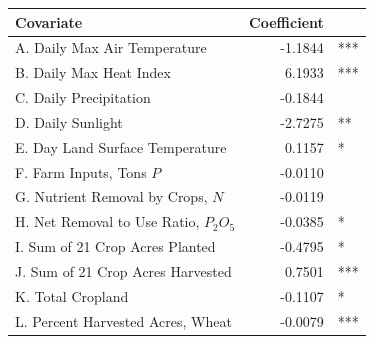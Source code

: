 \documentclass[paperwidth=42in,paperheight=44in,fontscale=0.31]{baposter}
\begin{document}
\begin{poster}
{\begin{center}
\begin{tabular}{l r l}
\toprule
\textbf{Covariate} & \textbf{Coefficient} & \\
\midrule
A. Daily Max Air Temperature \cite{nldas} & -1.1844  &  *** \\ %
B. Daily Max Heat Index \cite{nldas} &  6.1933  &  *** \\ %
C. Daily Precipitation  \cite{nldas} &  -0.1844  &  \\ %
D. Daily Sunlight   \cite{nldas}  & -2.7275  & ** \\ %
E. Day Land Surface Temperature \cite{modis} &  0.1157   &  *  \\ %
F. Farm Inputs, Tons $P$ \cite{nuGIS} & -0.0110 \\ %
G. Nutrient Removal by Crops, $N$ \cite{nuGIS} & -0.0119  &  \\   %
H. Net Removal to Use Ratio, $P_2 O_5$  \cite{nuGIS} & -0.0385  &  * \\ %
I. Sum of 21 Crop Acres Planted  \cite{nuGIS} & -0.4795   &  * \\ 
J. Sum of 21 Crop Acres Harvested  \cite{nuGIS} &  0.7501  &  *** \\
K. Total Cropland \cite{nuGIS} & -0.1107  &  *  \\%
L. Percent Harvested Acres, Wheat               & -0.0079 &  *** \\ %
 

\bottomrule
\end{tabular}
\label{coeftable}
\end{center}






}



\end{poster}
\end{document}
